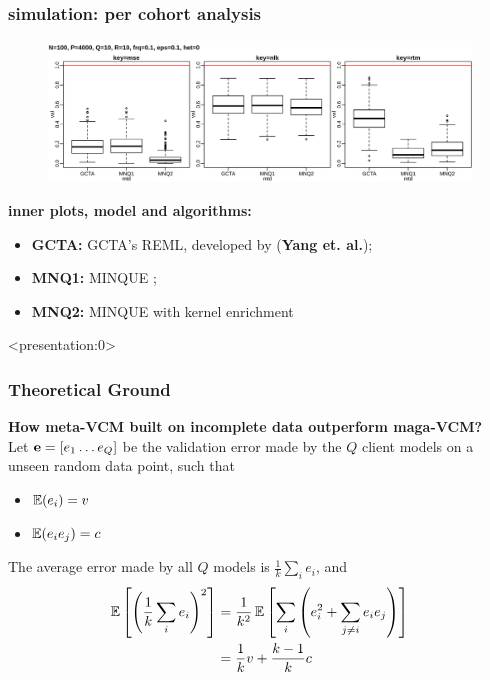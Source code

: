 \documentclass{beamer}
\begin{document}
\begin{frame} \frametitle{simulation: per cohort analysis}
  \begin{figure}
    \centering \includegraphics[width=.95\linewidth]{img/vcm_ply_mnq}
  \end{figure}
  {\color{blue}\textbf{inner plots, model and algorithms:}}
  \begin{itemize}
  \item \textbf{GCTA:} GCTA's REML, developed by (\textbf{Yang et. al.});
  \item \textbf{MNQ1:} MINQUE ;
  \item \textbf{MNQ2:} MINQUE with kernel enrichment
  \end{itemize}
\end{frame}
\begin{frame} <presentation:0> %
  \frametitle{Theoretical Ground} %
  \textbf{How meta-VCM built on incomplete data outperform maga-VCM?} \\
  Let $\mathbf{e}=[e_1 \dots e_Q]$ be the validation error made by the $Q$
  client models on a unseen random data point, such that
  \begin{itemize}
  \item $\operatorname{\mathbb{E}}(e_i) = v$
  \item $\operatorname{\mathbb{E}}(e_i e_j) = c$
  \end{itemize}
  The average error made by all $Q$ models is $\frac{1}{k}\sum_i e_i$,
  and
  \begin{align} \label{eq:beg} \operatorname{\mathbb{E}}\left[ \left(\frac{1}{k}\sum_i
        e_i\right)^2 \right]
    &= \frac{1}{k^2}\operatorname{\mathbb{E}}\left[\sum_i \left(e_i^2 + \sum_{j \ne i}e_ie_j \right)  \right] \\
    &= \frac{1}{k}v + \frac{k-1}{k}c
  \end{align}
\end{frame}
\end{document}
